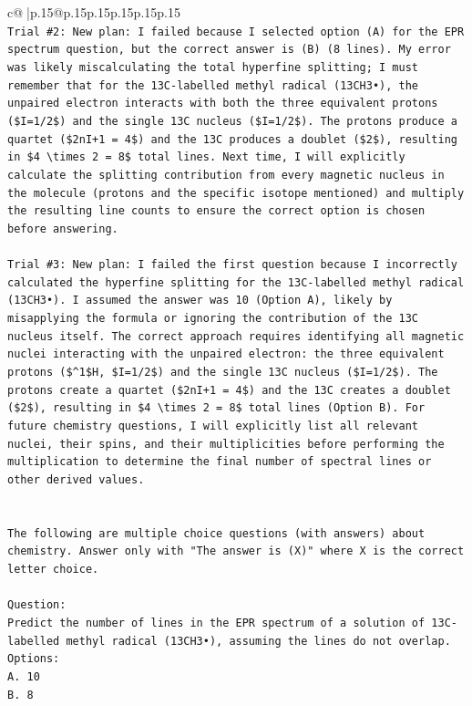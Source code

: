 \documentclass{article}
\begin{document}
{\begin{supertabular}{c@{$\;$}|p{.15\linewidth}@{}p{.15\linewidth}p{.15\linewidth}p{.15\linewidth}p{.15\linewidth}p{.15\linewidth}}
{{{\\ 
\texttt{Trial \#2: New plan: I failed because I selected option (A) for the EPR spectrum question, but the correct answer is (B) (8 lines). My error was likely miscalculating the total hyperfine splitting; I must remember that for the 13C{-}labelled methyl radical (13CH3•), the unpaired electron interacts with both the three equivalent protons (\$I=1/2\$) and the single 13C nucleus (\$I=1/2\$). The protons produce a quartet (\$2nI+1 = 4\$) and the 13C produces a doublet (\$2\$), resulting in \$4 \textbackslash{}times 2 = 8\$ total lines. Next time, I will explicitly calculate the splitting contribution from every magnetic nucleus in the molecule (protons and the specific isotope mentioned) and multiply the resulting line counts to ensure the correct option is chosen before answering.} \\
\\ 
\texttt{Trial \#3: New plan: I failed the first question because I incorrectly calculated the hyperfine splitting for the 13C{-}labelled methyl radical (13CH3•). I assumed the answer was 10 (Option A), likely by misapplying the formula or ignoring the contribution of the 13C nucleus itself. The correct approach requires identifying all magnetic nuclei interacting with the unpaired electron: the three equivalent protons (\$\^{}1\$H, \$I=1/2\$) and the single 13C nucleus (\$I=1/2\$). The protons create a quartet (\$2nI+1 = 4\$) and the 13C creates a doublet (\$2\$), resulting in \$4 \textbackslash{}times 2 = 8\$ total lines (Option B). For future chemistry questions, I will explicitly list all relevant nuclei, their spins, and their multiplicities before performing the multiplication to determine the final number of spectral lines or other derived values.} \\
\\ 
\\ 
\texttt{The following are multiple choice questions (with answers) about chemistry. Answer only with "The answer is (X)" where X is the correct letter choice.} \\
\\ 
\texttt{Question:} \\
\texttt{Predict the number of lines in the EPR spectrum of a solution of 13C{-}labelled methyl radical (13CH3•), assuming the lines do not overlap.} \\
\texttt{Options:} \\
\texttt{A. 10} \\
\texttt{B. 8} \\
}}}
\end{supertabular}}
\end{document}
